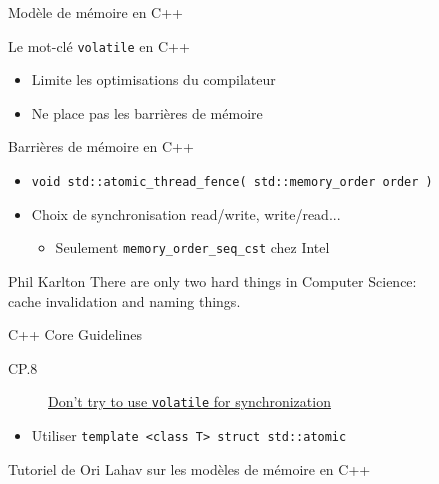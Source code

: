 \begin{frame}[fragile]{Modèle de mémoire en C++}
\vfill
  \begin{block}{Le mot-clé \lstinline{volatile} en C++}
    \begin{itemize}
    \item Limite les optimisations du compilateur
    \item \alert{Ne place pas les barrières de mémoire}
    \end{itemize}
  \end{block}
\vfill
  \begin{block}{Barrières de mémoire en C++}
      \begin{itemize}
      \item \lstinline{void std::atomic_thread_fence( std::memory_order order )}
      \item Choix de synchronisation read/write, write/read...
        \begin{itemize}
        \item Seulement \lstinline{memory_order_seq_cst} chez Intel
        \end{itemize}
      \end{itemize}
  \begin{shadequote}{Phil Karlton}
    There are only two hard things in Computer Science: \\cache invalidation and naming things.
  \end{shadequote}
  \end{block}

\vspace{-3mm}
\begin{alertblock}{C++ Core Guidelines}
    \begin{description}
    \item[CP.8] \href{https://isocpp.github.io/CppCoreGuidelines/CppCoreGuidelines#Rconc-volatile}{Don’t try to use \lstinline{volatile} for synchronization}
    \end{description}
    \begin{itemize}
    \item Utiliser \lstinline{template <class T> struct std::atomic}
    \end{itemize}
  \end{alertblock}
\vspace{-1mm}
  \begin{citing}
  \item Tutoriel de Ori Lahav sur les modèles de mémoire en C++
  \end{citing}
\end{frame}


